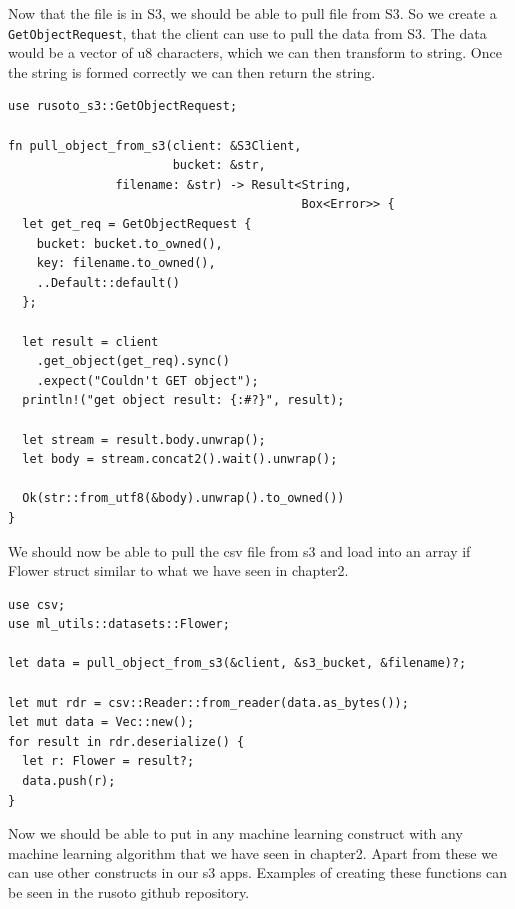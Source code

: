 \documentclass{book}
\begin{document}
Now that the file is in S3, we should be able to pull file from S3. So we create a \lstinline{GetObjectRequest}, that the client can use to pull the data from S3. The data would be a vector of u8 characters, which we can then transform to string. Once the string is formed correctly we can then return the string.

\begin{lstlisting}[caption={chapter4\\/working\_with\_data\\/s3\_files\\/src\\/main\\.rs},basicstyle=\small]
use rusoto_s3::GetObjectRequest;

fn pull_object_from_s3(client: &S3Client,
                       bucket: &str,
		       filename: &str) -> Result<String,
		                                 Box<Error>> {
  let get_req = GetObjectRequest {
    bucket: bucket.to_owned(),
    key: filename.to_owned(),
    ..Default::default()
  };

  let result = client
    .get_object(get_req).sync()
    .expect("Couldn't GET object");
  println!("get object result: {:#?}", result);

  let stream = result.body.unwrap();
  let body = stream.concat2().wait().unwrap();

  Ok(str::from_utf8(&body).unwrap().to_owned())
}
\end{lstlisting}

We should now be able to pull the csv file from s3 and load into an array if Flower struct similar to what we have seen in chapter2.


\begin{lstlisting}[caption={chapter4\\/working\_with\_data\\/s3\_files\\/src\\/main\\.rs},basicstyle=\small]
use csv;
use ml_utils::datasets::Flower;

let data = pull_object_from_s3(&client, &s3_bucket, &filename)?;

let mut rdr = csv::Reader::from_reader(data.as_bytes());
let mut data = Vec::new();
for result in rdr.deserialize() {
  let r: Flower = result?;
  data.push(r);
}
\end{lstlisting}

Now we should be able to put in any machine learning construct with any machine learning algorithm that we have seen in chapter2. Apart from these we can use other constructs in our s3 apps. Examples of creating these functions can be seen in the rusoto github repository.
\end{document}
